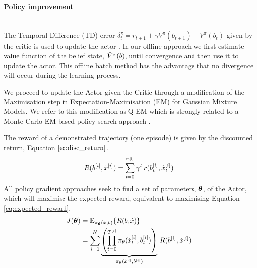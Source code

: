 \paragraph{Policy improvement}\\

The Temporal Difference (TD) error $\delta^{\pi}_t = r_{t+1} + \gamma V^{\pi}(b_{t+1}) - V^{\pi}(b_t)$ 
given by the critic is used to update the actor  \cite[Chap. 6]{sutton1998reinforcement}. 
In our offline approach we first estimate value function of the belief state, $\hat{V}^{\pi}(b)$, 
until convergence and then use it to update the actor. This offline batch 
method has the advantage that no divergence will occur during the learning process.

We proceed to update the Actor given the Critic through a modification of the Maximisation step in  Expectation-Maximisation (EM) 
for Gaussian Mixture Models. We refer to this modification as Q-EM which is strongly related to a Monte-Carlo EM-based policy 
search approach \cite[p.50]{DeisenrothNP2013}. 

The reward of a demonstrated trajectory (one episode) is given by the discounted return, Equation $\ref{eq:disc_return}$.
\begin{equation}\label{eq:disc_return}
 R(b^{[i]},\dot{x}^{[i]}) = \sum_{t=0}^{\mathrm{T^{[i]}}} \gamma^t \, r(b^{[i]}_t,\dot{x}^{[i]}_t)
\end{equation}
All policy gradient approaches seek to find a set of parameters, $\boldsymbol{\theta}$, of the Actor,
which will maximise the expected reward, equivalent to maximising Equation \ref{eq:expected_reward}.
\begin{align}\label{eq:expected_reward}
 J(\boldsymbol{\theta}) &= \mathbb{E}_{\pi_{\boldsymbol{\theta}}(\dot{x},b)}\{R(b,\dot{x})\} \nonumber \\
	  &= \sum\limits_{i=1}^{N}   \underbrace{\left( \prod_{t=0}^{T^{[i]}} \pi_{\boldsymbol{\theta}}(\dot{x}^{[i]}_t,b^{[i]}_t) \right)}_{\pi_{\boldsymbol{\theta}}(\dot{x}^{[i]},b^{[i]})} \, R(b^{[i]},\dot{x}^{[i]}) 
\end{align}

